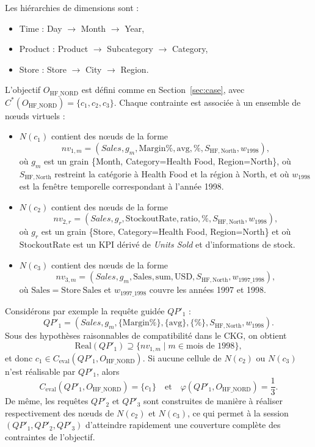 \documentclass[journal]{IEEEtran}
\begin{document}
Les hiérarchies de dimensions sont :
\begin{itemize}
  \item Time : Day $\rightarrow$ Month $\rightarrow$ Year,
  \item Product : Product $\rightarrow$ Subcategory $\rightarrow$ Category,
  \item Store : Store $\rightarrow$ City $\rightarrow$ Region.
\end{itemize}

L'objectif $O_{\mathrm{HF\_NORD}}$ est défini comme en Section~\ref{sec:case}, avec $C^*(O_{\mathrm{HF\_NORD}})=\{c_1,c_2,c_3\}$. Chaque contrainte est associée à un ensemble de nœuds virtuels :
\begin{itemize}
  \item $N(c_1)$ contient des nœuds de la forme
  \[
  nv_{1,m}=(\textit{Sales},g_m,\mathrm{Margin\%},\mathrm{avg},\%,S_{\mathrm{HF,North}},w_{1998}),
  \]
  où $g_m$ est un grain \{Month, Category=Health Food, Region=North\}, où $S_{\mathrm{HF,North}}$ restreint la catégorie à Health Food et la région à North, et où $w_{1998}$ est la fenêtre temporelle correspondant à l'année 1998.
  \item $N(c_2)$ contient des nœuds de la forme
  \[
  nv_{2,r}=(\textit{Sales},g_r,\mathrm{StockoutRate},\mathrm{ratio},\%,S_{\mathrm{HF,North}},w_{1998}),
  \]
  où $g_r$ est un grain \{Store, Category=Health Food, Region=North\} et où $\mathrm{StockoutRate}$ est un KPI dérivé de \textit{Units Sold} et d'informations de stock.
  \item $N(c_3)$ contient des nœuds de la forme
  \[
  nv_{3,m}=(\textit{Sales},g_m,\mathrm{Sales},\mathrm{sum},\text{USD},S_{\mathrm{HF,North}},w_{1997\_1998}),
  \]
  où $\mathrm{Sales}=\mathrm{Store\ Sales}$ et $w_{1997\_1998}$ couvre les années 1997 et 1998.
\end{itemize}

Considérons par exemple la requête guidée $QP'_1$ :
\[
QP'_1=(\textit{Sales},g_m,\{\mathrm{Margin\%}\},\{\mathrm{avg}\},\{\%\},S_{\mathrm{HF,North}},w_{1998}).
\]
Sous des hypothèses raisonnables de compatibilité dans le CKG, on obtient
\[
\mathrm{Real}(QP'_1)\supseteq \{nv_{1,m}\mid m\in \text{mois de 1998}\},
\]
et donc $c_1\in C_{\mathrm{eval}}(QP'_1,O_{\mathrm{HF\_NORD}})$. Si aucune cellule de $N(c_2)$ ou $N(c_3)$ n'est réalisable par $QP'_1$, alors
\[
C_{\mathrm{eval}}(QP'_1,O_{\mathrm{HF\_NORD}})=\{c_1\}
\quad\text{et}\quad
\varphi(QP'_1,O_{\mathrm{HF\_NORD}})=\frac{1}{3}.
\]
De même, les requêtes $QP'_2$ et $QP'_3$ sont construites de manière à réaliser respectivement des nœuds de $N(c_2)$ et $N(c_3)$, ce qui permet à la session $(QP'_1,QP'_2,QP'_3)$ d'atteindre rapidement une couverture complète des contraintes de l'objectif.
\end{document}
